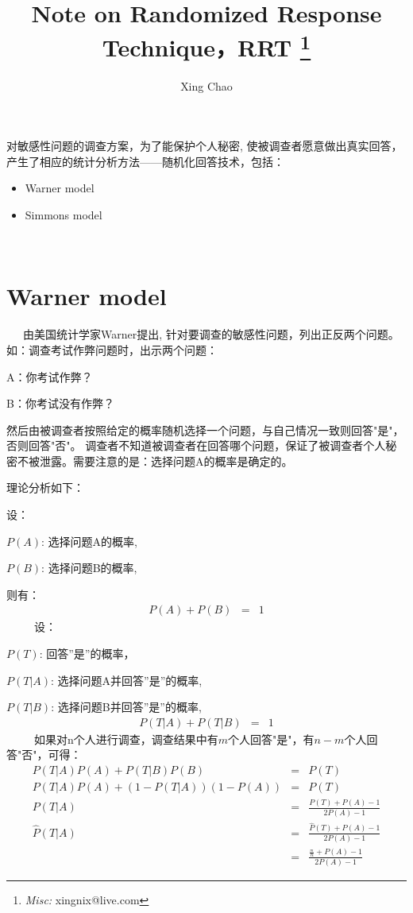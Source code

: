 \documentclass{article}
\newcommand{\tmmisc}[1]{\thanks{\textit{Misc:} #1}}
\newcommand{\tmstrong}[1]{\textbf{#1}}
\begin{document}
\begin{CJK*}{UTF8}{gbsn}

\title{
  {\tmstrong{Note on Randomized Response Technique，RRT}}
  \tmmisc{xingnix@live.com}
}

\author{Xing Chao}

\maketitle

对敏感性问题的调查方案，为了能保护个人秘密,
使被调查者愿意做出真实回答，产生了相应的统计分析方法------随机化回答技术，包括：
\begin{itemize}
  \item Warner model
  
  \item Simmons model
  
  \ 
\end{itemize}

\section{Warner model}

\ \ \ 由美国统计学家Warner提出,
针对要调查的敏感性问题，列出正反两个问题。如：调查考试作弊问题时，出示两个问题：

A：你考试作弊？

B：你考试没有作弊？

然后由被调查者按照给定的概率随机选择一个问题，与自己情况一致则回答"是"，否则回答"否"。
调查者不知道被调查者在回答哪个问题，保证了被调查者个人秘密不被泄露。需要注意的是：选择问题A的概率是确定的。

理论分析如下：

设：

$P (A)$: 选择问题A的概率,

$P (B)$: 选择问题B的概率,

则有：
\begin{eqnarray*}
  P (A) + P (B) & = & 1
\end{eqnarray*}
\ \ \ \ \ 设：

$P (T)$: 回答''是''的概率，

$P (T|A)$: 选择问题A并回答''是''的概率,

$P (T|B)$: 选择问题B并回答''是''的概率,
\begin{eqnarray*}
  P (T|A) + P (T|B) & = & 1
\end{eqnarray*}
\ \ \ \ \
如果对n个人进行调查，调查结果中有$m$个人回答"是"，有$n
- m$个人回答"否"，可得：
\begin{eqnarray*}
  P (T|A) P (A) + P (T|B) P (B) & = & P (T)\\
  P (T|A) P (A) + (1 - P (T|A)) (1 - P (A)) & = & P (T)\\
  P (T|A) & = & \frac{P (T) + P (A) - 1}{2 P (A) - 1}\\
  \hat{P} (T|A) & = & \frac{\hat{P} (T) + P (A) - 1}{2 P (A) - 1}\\
  & = & \frac{\frac{_m}{n} + P (A) - 1}{2 P (A) - 1}
\end{eqnarray*}



\end{CJK*}
\end{document}

